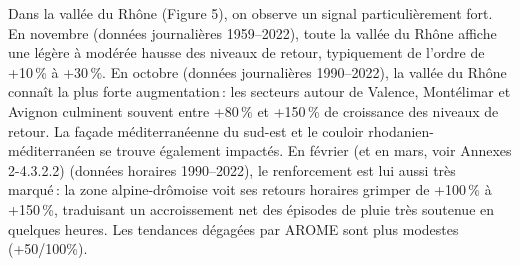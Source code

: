 \documentclass[
  article,
  nofooter,
  noheadings]{jss}
\begin{document}
Dans la vallée du Rhône (Figure 5), on observe un signal
particulièrement fort. En novembre (données journalières 1959--2022),
toute la vallée du Rhône affiche une légère à modérée hausse des niveaux
de retour, typiquement de l'ordre de +10\,\% à +30\,\%. En octobre
(données journalières 1990--2022), la vallée du Rhône connaît la plus
forte augmentation\,: les secteurs autour de Valence, Montélimar et
Avignon culminent souvent entre +80\,\% et +150\,\% de croissance des
niveaux de retour. La façade méditerranéenne du sud-est et le couloir
rhodanien-méditerranéen se trouve également impactés. En février (et en
mars, voir Annexes 2-4.3.2.2) (données horaires 1990--2022), le
renforcement est lui aussi très marqué\,: la zone alpine-drômoise voit
ses retours horaires grimper de +100\,\% à +150\,\%, traduisant un
accroissement net des épisodes de pluie très soutenue en quelques
heures. Les tendances dégagées par AROME sont plus modestes (+50/100\%).
\end{document}
